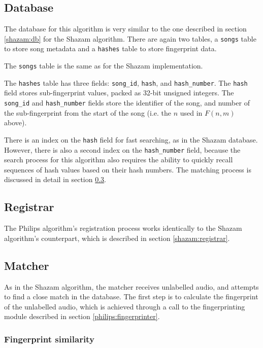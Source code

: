 \documentclass[12pt,a4paper,twoside,openright]{report}
\begin{document}
\subsection{Database}

The database for this algorithm is very similar to the one described in section \ref{shazam:db} for the Shazam algorithm. There are again two tables, a \lstinline{songs} table to store song metadata and a \lstinline{hashes} table to store fingerprint data.

The \lstinline{songs} table is the same as for the Shazam implementation.

The \lstinline{hashes} table has three fields: \lstinline{song_id}, \lstinline{hash}, and \lstinline{hash_number}. The \lstinline{hash} field stores sub-fingerprint values, packed as 32-bit unsigned integers. The \lstinline{song_id} and \lstinline{hash_number} fields store the identifier of the song, and number of the sub-fingerprint from the start of the song (i.e. the $n$ used in $F(n,m)$ above).

There is an index on the \lstinline{hash} field for fast searching, as in the Shazam database. However, there is also a second index on the \lstinline{hash_number} field, because the search process for this algorithm also requires the ability to quickly recall sequences of hash values based on their hash numbers. The matching process is discussed in detail in section \ref{philips:matcher}.


\subsection{Registrar}

The Philips algorithm's registration process works identically to the Shazam algorithm's counterpart, which is described in section \ref{shazam:registrar}.


\subsection{Matcher}
\label{philips:matcher}

As in the Shazam algorithm, the matcher receives unlabelled audio, and attempts to find a close match in the database. The first step is to calculate the fingerprint of the unlabelled audio, which is achieved through a call to the fingerprinting module described in section \ref{philips:fingerprinter}.

\subsubsection{Fingerprint similarity}
\end{document}
